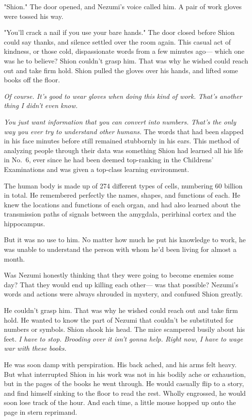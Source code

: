 "Shion." The door opened, and Nezumi's voice called him. A pair of work
gloves were tossed his way.

"You'll crack a nail if you use your bare hands." The door closed before
Shion could say thanks, and silence settled over the room again. This
casual act of kindness, or those cold, dispassionate words from a few
minutes ago--- which one was he to believe? Shion couldn't grasp him. That
was why he wished could reach out and take firm hold. Shion pulled the
gloves over his hands, and lifted some books off the floor.

\emph{Of course. It's good to wear gloves when doing this kind of work. That's
another thing I didn't even know.}

\emph{You just want information that you can convert into numbers. That's the
only way you ever try to understand other humans.} The words that had
been slapped in his face minutes before still remained stubbornly in his
ears. This method of analyzing people through their data was something
Shion had learned all his life in No.~6, ever since he had been deemed
top-ranking in the Childrens' Examinations and was given a top-class
learning environment.

The human body is made up of 274 different types of cells, numbering 60
billion in total. He remembered perfectly the names, shapes, and
functions of each. He knew the locations and functions of each organ,
and had also learned about the transmission paths of signals between the
amygdala, perirhinal cortex and the hippocampus.

But it was no use to him. No matter how much he put his knowledge to
work, he was unable to understand the person with whom he'd been living
for almost a month.

Was Nezumi honestly thinking that they were going to become enemies some
day? That they would end up killing each other--- was that possible?
Nezumi's words and actions were always shrouded in mystery, and confused
Shion greatly.

He couldn't grasp him. That was why he wished could reach out and take
firm hold. He wanted to know the part of Nezumi that couldn't be
substituted for numbers or symbols. Shion shook his head. The mice
scampered busily about his feet. \emph{I have to stop. Brooding over it isn't
gonna help. Right now, I have to wage war with these books.}

He was soon damp with perspiration. His back ached, and his arms felt
heavy. But what interrupted Shion in his work was not in his bodily ache
or exhaustion, but in the pages of the books he went through. He would
casually flip to a story, and find himself sinking to the floor to read
the rest. Wholly engrossed, he would soon lose track of the hour. And
each time, a little mouse hopped up onto the page in stern reprimand.

